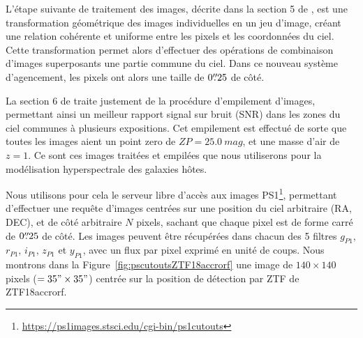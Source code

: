 \documentclass[../main/main.tex]{subfiles}
\begin{document}
L'étape suivante de traitement des images, décrite dans la section 5 de
\citet{Waters2020}, est une transformation géométrique des images
individuelles en un jeu d'image, créant une
relation cohérente et uniforme entre les pixels et les coordonnées du ciel. Cette transformation permet alors d'effectuer des opérations de
combinaison d'images superposants une partie commune du ciel. Dans ce
nouveau système d'agencement, les pixels ont alors une taille de
$0\overset{\prime\prime}{.}25$ de côté.


La section 6 de \citet{Waters2020} traite justement de la procédure
d'empilement d'images, permettant ainsi un meilleur rapport signal sur
bruit (SNR) dans les zones du ciel communes à plusieurs expositions. Cet
empilement est effectué de sorte que toutes les images aient un point
zero de $ZP=\SI{25.0}{mag}$, et une masse d'air de $z=1$. Ce
sont ces images traitées et empilées que nous utiliserons pour la
modélisation hyperspectrale des galaxies hôtes.


Nous utilisons pour cela le serveur libre d'accès aux images
PS1\footnote{\url{https://ps1images.stsci.edu/cgi-bin/ps1cutouts}},
permettant d'effectuer une requête d'images centrées sur une position du
ciel arbitraire (RA, DEC), et de côté arbitraire $N$ pixels, sachant que chaque pixel
est de forme carré de $0\overset{\prime\prime}{.}25$ de côté. Les images peuvent être
récupérées dans chacun des 5 filtres $g_{P1}$, $r_{P1}$, $i_{P1}$,
$z_{P1}$ et $y_{P1}$, avec un flux par pixel exprimé en unité de coups. Nous montrons dans la
Figure~\ref{fig:pscutoutsZTF18accrorf} une image de $140\times140$
pixels ($=35"\times35"$) centrée sur la position de détection par ZTF de
ZTF18accrorf. 
\end{document}
